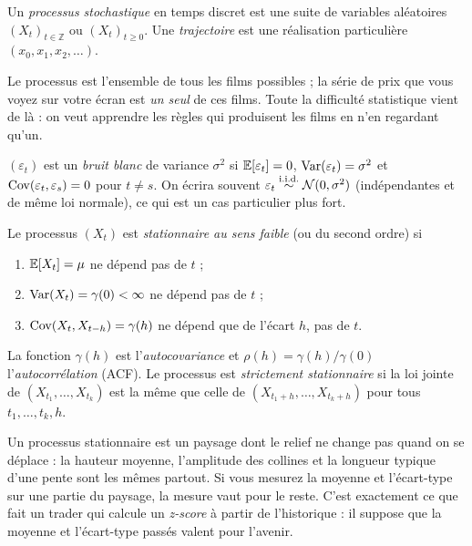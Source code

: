 \begin{definition}
Un \emph{processus stochastique} en temps discret est une suite de variables aléatoires $(X_t)_{t\in\mathbb{Z}}$ ou $(X_t)_{t\ge0}$. Une \emph{trajectoire} est une réalisation particulière $(x_0, x_1, x_2, \dots)$.
\end{definition}

\begin{intuition}
Le processus est l'ensemble de tous les films possibles ; la série de prix que vous voyez sur votre écran est \emph{un seul} de ces films. Toute la difficulté statistique vient de là : on veut apprendre les règles qui produisent les films en n'en regardant qu'un.
\end{intuition}

\begin{definition}
$(\varepsilon_t)$ est un \emph{bruit blanc} de variance $\sigma^2$ si $\mathbb{E}[\varepsilon_t]=0$, $\operatorname{Var}(\varepsilon_t) = \sigma^2$ et $\operatorname{Cov}(\varepsilon_t,\varepsilon_s) = 0$ pour $t \ne s$. On écrira souvent $\varepsilon_t \overset{\text{i.i.d.}}{\sim} \mathcal{N}(0,\sigma^2)$ (indépendantes et de même loi normale), ce qui est un cas particulier plus fort.
\end{definition}

\begin{definition}[Stationnarité]
Le processus $(X_t)$ est \emph{stationnaire au sens faible} (ou \og du second ordre\fg) si
\begin{enumerate}[label=(\roman*)]
\item $\mathbb{E}[X_t] = \mu$ ne dépend pas de $t$ ;
\item $\operatorname{Var}(X_t) = \gamma(0) < \infty$ ne dépend pas de $t$ ;
\item $\operatorname{Cov}(X_t, X_{t-h}) = \gamma(h)$ ne dépend que de l'écart $h$, pas de $t$.
\end{enumerate}
La fonction $\gamma(h)$ est l'\emph{autocovariance} et $\rho(h) = \gamma(h)/\gamma(0)$ l'\emph{autocorrélation} (ACF). Le processus est \emph{strictement stationnaire} si la loi jointe de $(X_{t_1},\dots,X_{t_k})$ est la même que celle de $(X_{t_1+h},\dots,X_{t_k+h})$ pour tous $t_1,\dots,t_k,h$.
\end{definition}

\begin{intuition}
Un processus stationnaire est un paysage dont le relief ne change pas quand on se déplace : la hauteur moyenne, l'amplitude des collines et la longueur typique d'une pente sont les mêmes partout. Si vous mesurez la moyenne et l'écart-type sur une partie du paysage, la mesure vaut pour le reste. C'est exactement ce que fait un trader qui calcule un \emph{z-score} à partir de l'historique : il suppose que la moyenne et l'écart-type passés valent pour l'avenir.
\end{intuition}

